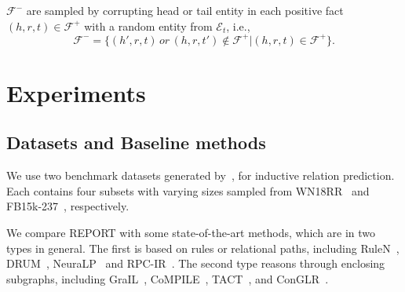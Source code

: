 \documentclass{article}
\begin{document}
$\mathcal{F}^-$ are sampled by corrupting head or tail entity in each positive fact $(h,r,t)\in\mathcal{F}^+$ with a 
random entity from $\mathcal{E}_t$, i.e.,
 \begin{equation}
     \mathcal{F}^-=\{(h',r,t)\, or\, (h,r,t')\notin\mathcal{F}^+|(h,r,t)\in\mathcal{F}^+\}.
 \end{equation}
 



\section{Experiments}


\subsection{Datasets and Baseline methods}
We use two benchmark datasets generated by~\cite{grail}, for inductive relation prediction. Each contains four subsets with varying sizes sampled from WN18RR~\cite{wn18rr} and FB15k-237~\cite{fb15k-237}, respectively.


We compare REPORT with some state-of-the-art methods, which are in two types in general. 
The first is based on rules or relational paths, including RuleN~\cite{rulen}, DRUM~\cite{drum}, NeuraLP~\cite{neurallp} and RPC-IR~\cite{rpc-ir}.
The second type reasons through enclosing subgraphs, including GraIL~\cite{grail}, CoMPILE~\cite{mai2021communicative}, TACT~\cite{tact}, and ConGLR~\cite{conglr}.
\end{document}
